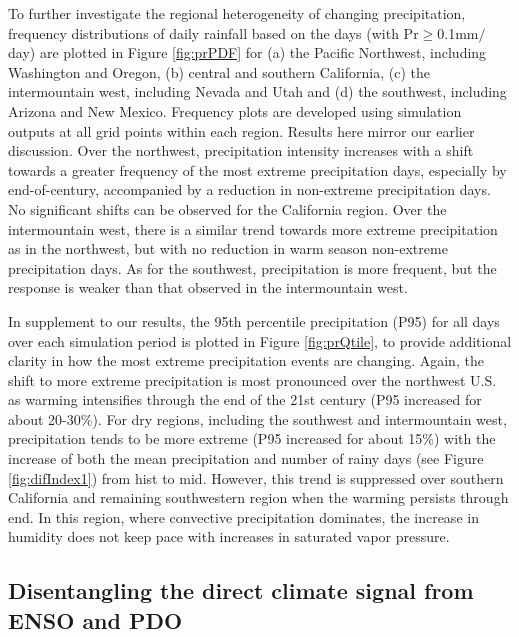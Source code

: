 \documentclass{ametsoc}
\begin{document}
To further investigate the regional heterogeneity of changing precipitation, frequency distributions of daily rainfall based on the days (with Pr$\geq$0.1mm$/$day) are plotted in Figure \ref{fig:prPDF} for (a) the Pacific Northwest, including Washington and Oregon, (b) central and southern California, (c) the intermountain west, including Nevada and Utah and (d) the southwest, including Arizona and New Mexico.  Frequency plots are developed using simulation outputs at all grid points within each region. Results here mirror our earlier discussion.  Over the northwest, precipitation intensity increases with a shift towards a greater frequency of the most extreme precipitation days, especially by end-of-century, accompanied by a reduction in non-extreme precipitation days. No significant shifts can be observed for the California region. Over the intermountain west, there is a similar trend towards more extreme precipitation as in the northwest, but with no reduction in warm season non-extreme precipitation days. As for the southwest, precipitation is more frequent, but the response is weaker than that observed in the intermountain west.

In supplement to our results, the 95th percentile precipitation (P95) for all days over each simulation period is plotted in Figure \ref{fig:prQtile}, to provide additional clarity in how the most extreme precipitation events are changing. Again, the shift to more extreme precipitation is most pronounced over the northwest U.S. as warming intensifies through the end of the 21st century (P95 increased for about 20-30$\%$). For dry regions, including the southwest and intermountain west, precipitation tends to be more extreme (P95 increased for about 15$\%$) with the increase of both the mean precipitation and number of rainy days (see Figure \ref{fig:difIndex1}) from \textsf{hist} to \textsf{mid}. However, this trend is suppressed over southern California and remaining southwestern region when the warming persists through \textsf{end}.  In this region, where convective precipitation dominates, the increase in humidity does not keep pace with increases in saturated vapor pressure.


\subsection{Disentangling the direct climate signal from ENSO and PDO} \label{sec:IsolatingENSO}
\end{document}
